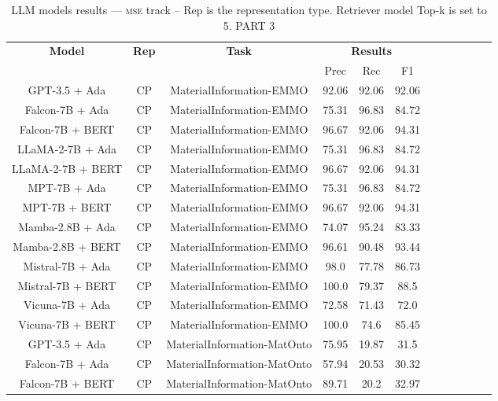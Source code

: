 \begin{table}
        \centering
        \small
        \caption{LLM models results --- \textsc{mse} track -- Rep is the representation type. Retriever model Top-k is set to 5. PART 3 } \label{tab:llm_mse3}
        \begin{tabular}{|c|c|c|c|c|c|c|c|c|c|c|c|}
            \hline
             \multirow{2}{*}{\textbf{Model}}  & \multirow{2}{*}{\textbf{Rep}}  & \multirow{2}{*}{\textbf{Task}} &  \multicolumn{3}{c|}{\textbf{Results}} \\
             \cline{4-6}
              & & & Prec & Rec & F1  \\
            \hline
	GPT-3.5 + Ada  & CP & MaterialInformation-EMMO  &  92.06 &  92.06 & 92.06  \\
	Falcon-7B + Ada  & CP & MaterialInformation-EMMO  &  75.31 &  96.83 & 84.72  \\
	Falcon-7B + BERT  & CP & MaterialInformation-EMMO  &  96.67 &  92.06 & 94.31  \\
	LLaMA-2-7B + Ada  & CP & MaterialInformation-EMMO  &  75.31 &  96.83 & 84.72  \\
	LLaMA-2-7B + BERT  & CP & MaterialInformation-EMMO  &  96.67 &  92.06 & 94.31  \\
	MPT-7B + Ada  & CP & MaterialInformation-EMMO  &  75.31 &  96.83 & 84.72  \\
	MPT-7B + BERT  & CP & MaterialInformation-EMMO  &  96.67 &  92.06 & 94.31  \\
	Mamba-2.8B + Ada  & CP & MaterialInformation-EMMO  &  74.07 &  95.24 & 83.33  \\
	Mamba-2.8B + BERT  & CP & MaterialInformation-EMMO  &  96.61 &  90.48 & 93.44  \\
	Mistral-7B + Ada  & CP & MaterialInformation-EMMO  &  98.0 &  77.78 & 86.73  \\
	Mistral-7B + BERT  & CP & MaterialInformation-EMMO  &  100.0 &  79.37 & 88.5  \\
	Vicuna-7B + Ada  & CP & MaterialInformation-EMMO  &  72.58 &  71.43 & 72.0  \\
	Vicuna-7B + BERT  & CP & MaterialInformation-EMMO  &  100.0 &  74.6 & 85.45  \\
	\hline
	GPT-3.5 + Ada  & CP & MaterialInformation-MatOnto  &  75.95 &  19.87 & 31.5  \\
	Falcon-7B + Ada  & CP & MaterialInformation-MatOnto  &  57.94 &  20.53 & 30.32  \\
	Falcon-7B + BERT  & CP & MaterialInformation-MatOnto  &  89.71 &  20.2 & 32.97  \\

\end{tabular}
\end{table}
